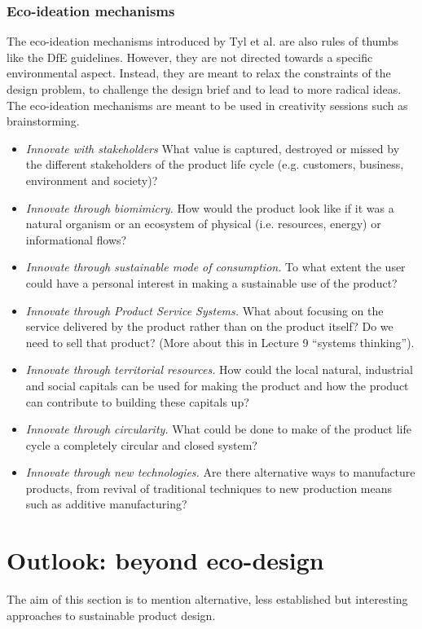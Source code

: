 \documentclass{article}
\begin{document}
\subsubsection{Eco-ideation mechanisms}
\label{sec:ecoAsit}
The eco-ideation mechanisms introduced by Tyl et al. \cite{tyl2016esm} are also rules of thumbs like the DfE guidelines. However, they are not directed towards a specific environmental aspect. Instead, they are meant to relax the constraints of the design problem, to challenge the design brief and to lead to more radical ideas. The eco-ideation mechanisms are meant to be used in creativity sessions such as brainstorming. 
\begin{itemize}
	\item \emph{Innovate with stakeholders} What value is captured, destroyed or missed by the different stakeholders of the product life cycle (e.g. customers, business, environment and society)?
	\item \emph{Innovate through biomimicry.} How would the product look like if it was a natural organism or an ecosystem of physical (i.e. resources, energy) or informational flows?
	\item \emph{Innovate through sustainable mode of consumption.} To what extent the user could have a personal interest in making a sustainable use of the product?
	\item \emph{Innovate through Product Service Systems.} What about focusing on the service delivered by the product rather than on the product itself? Do we need to sell that product? (More about this in Lecture 9 ``systems thinking'').
	\item \emph{Innovate through territorial resources.} How could the local natural, industrial and social capitals can be used for making the product and how the product can contribute to building these capitals up?
	\item \emph{Innovate through circularity.} What could be done to make of the product life cycle a completely circular and closed system?
	\item \emph{Innovate through new technologies.} Are there alternative ways to manufacture products, from revival of traditional techniques to new production means such as additive manufacturing?
\end{itemize}

\section{Outlook: beyond eco-design}
\label{sec:SPD}
The aim of this section is to mention alternative, less established but interesting approaches to sustainable product design.
\end{document}
